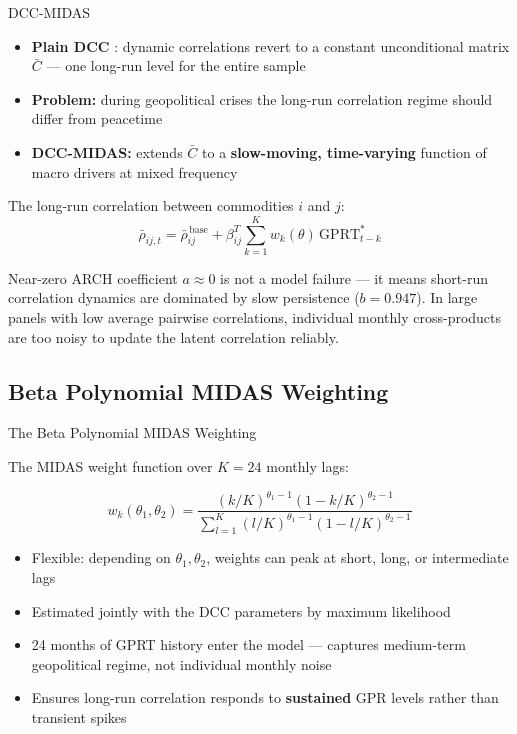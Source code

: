 ﻿\documentclass[aspectratio=1610]{beamer}
\begin{document}
\begin{frame}[shrink=10]{DCC-MIDAS \parencite{colacito_betas_2011}}

  \begin{itemize}
    \item \textbf{Plain DCC} \parencite{engle_dynamic_2002}: dynamic correlations
          revert to a constant unconditional matrix $\bar{C}$ --- one long-run
          level for the entire sample
    \item \textbf{Problem:} during geopolitical crises the long-run correlation
          regime should differ from peacetime
    \item \textbf{DCC-MIDAS:} extends $\bar{C}$ to a \textbf{slow-moving,
          time-varying} function of macro drivers at mixed frequency
  \end{itemize}

  The long-run correlation between commodities $i$ and $j$:
  \[
    \bar{\rho}_{ij,t} = \bar{\rho}_{ij}^{\,\text{base}} +
    \beta_{ij}^T \sum_{k=1}^{K} w_k(\theta)\,\mathrm{GPRT}_{t-k}^*
  \]

  \begin{alertblock}{Near-zero ARCH coefficient}
    $a \approx 0$ is not a model failure --- it means short-run correlation
    dynamics are dominated by slow persistence ($b = 0.947$). In large panels
    with low average pairwise correlations, individual monthly cross-products
    are too noisy to update the latent correlation reliably.
  \end{alertblock}

\end{frame}

\subsection{Beta Polynomial MIDAS Weighting}

\begin{frame}[shrink=10]{The Beta Polynomial MIDAS Weighting}

  The MIDAS weight function over $K = 24$ monthly lags:

  \[
    w_k(\theta_1, \theta_2) =
    \frac{(k/K)^{\theta_1 - 1}(1 - k/K)^{\theta_2 - 1}}
         {\sum_{l=1}^K (l/K)^{\theta_1-1}(1-l/K)^{\theta_2-1}}
  \]

  \begin{itemize}
    \item Flexible: depending on $\theta_1, \theta_2$, weights can peak at
          short, long, or intermediate lags
    \item Estimated jointly with the DCC parameters by maximum likelihood
    \item 24 months of GPRT history enter the model --- captures medium-term
          geopolitical regime, not individual monthly noise
    \item Ensures long-run correlation responds to \textbf{sustained} GPR
          levels rather than transient spikes
  \end{itemize}

\end{frame}
\end{document}
